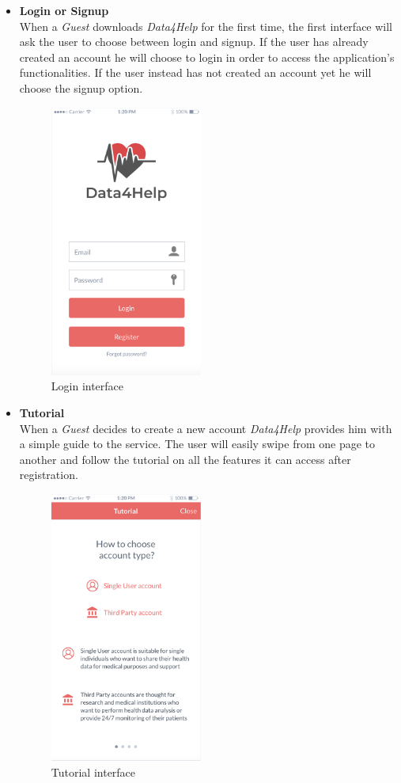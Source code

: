 \documentclass[titlepage]{article}
\begin{document}
\begin{itemize}
\begin{itemize}
				\item{\bf Login or Signup}\\
			When a {\it Guest} downloads {\it Data4Help} for the first time, the first interface will ask the user to choose between login and signup. If the user has already created an account he will choose to login in order to access the application’s functionalities. If the user instead has not created an account yet he will choose the signup option.\\
					\begin{figure}[H]
						\center
  						\includegraphics[width=5cm]{Mockup/mockupLogin.png}
  						\caption{Login interface}
 						 \label{fig:Login}
					\end{figure}

				\item{\bf Tutorial}\\
				When a {\it Guest} decides to create a new account {\it Data4Help} provides him with a simple guide to the service. The user will easily swipe from one page to another and follow the tutorial on all the features it can access after registration. \\
					\begin{figure}[H]
						\center
  						\includegraphics[width=5cm]{Mockup/mockupTutorial.png}
  						\caption{Tutorial interface}
 					 	\label{fig:Tutorial}
					\end{figure}


\end{itemize}
\end{itemize}
\end{document}
